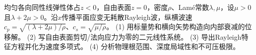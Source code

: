 均匀各向同性线弹性体占\(z<0\)，自由表面\(z=0\)，密度\(\rho\)、Lamé常数\(\lambda,\mu\)，设\(\mu>0\)且\(\lambda+2\mu>0\)。沿\(x\)传播平面应变无耗散Rayleigh波，纵横波速\(c_p=\sqrt{(\lambda+2\mu)/\rho}\)、\(c_s=\sqrt{\mu/\rho}\)。
(1) 用标量势和横向矢势构造向内部衰减的位移解。
(2) 写自由表面剪切/法向应力为零的二元线性系统。
(3) 导出Rayleigh特征方程并化为速度多项式。
(4) 分析物理根范围、深度局域性和不可压极限。
